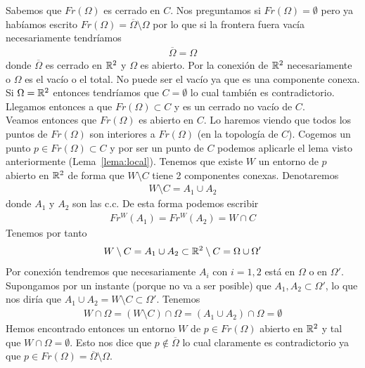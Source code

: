 \begin{observacion}
    Sabemos que $Fr(\Omega)$ es cerrado en $C$. Nos preguntamos si $Fr(\Omega)=\emptyset$ pero ya habíamos escrito $Fr(\Omega) = \overline{\Omega} \setminus \Omega$ por lo que si la frontera fuera vacía necesariamente tendríamos
    \begin{gather*}
        \overline{\Omega} = \Omega
    \end{gather*}
    donde $\overline{\Omega}$ es cerrado en $\mathbb{R}^2$ y $\Omega$ es abierto. Por la conexión de $\mathbb{R}^2$ necesariamente o $\Omega$ es el vacío o el total. No puede ser el vacío ya que es una componente conexa. Si $\Omega=\mathbb{R}^2$ entonces tendríamos que $C=\emptyset$ lo cual también es contradictorio. Llegamos entonces a que $Fr(\Omega)\subset C$ y es un cerrado no vacío de $C$.\\

    Veamos entonces que $Fr(\Omega)$ es abierto en $C$. Lo haremos viendo que todos los puntos de $Fr(\Omega)$ son interiores a $Fr(\Omega)$ (en la topología de $C$). Cogemos un punto $p\in Fr(\Omega)\subset C$ y por ser un punto de $C$ podemos aplicarle el lema visto anteriormente (Lema~\ref{lema:local}). Tenemos que existe $W$ un entorno de $p$ abierto en $\mathbb{R}^2$ de forma que $W\setminus C$ tiene 2 componentes conexas. Denotaremos 
    \begin{gather*}
        W \setminus C = A_1 \cup A_2
    \end{gather*}
    donde $A_1$ y $A_2$ son las c.c. De esta forma podemos escribir
    \begin{gather*}
        Fr^W(A_1) = Fr^W(A_2) = W \cap C
    \end{gather*}
    Tenemos por tanto
    \begin{gather*}
        W \setminus C = A_1 \cup A_2 \subset \mathbb{R}^2 \setminus C = \Omega \cup \Omega'
    \end{gather*}
    Por conexión tendremos que necesariamente $A_i$ con $i=1,2$ está en $\Omega$ o en $\Omega'$. Supongamos por un instante (porque no va a ser posible) que $A_1, A_2\subset \Omega'$, lo que nos diría que $A_1\cup A_2 = W \setminus C \subset  \Omega'$. Tenemos
    \begin{gather*}
        W \cap \Omega = (W \setminus C) \cap \Omega = (A_1\cup A_2) \cap \Omega = \emptyset
    \end{gather*}
    Hemos encontrado entonces un entorno $W$ de $p\in Fr(\Omega)$ abierto en $\mathbb{R}^2$ y tal que $W\cap \Omega = \emptyset$. Esto nos dice que $p\not\in \overline{\Omega}$ lo cual claramente es contradictorio ya que $p\in Fr(\Omega) = \overline{\Omega} \setminus \Omega$.\\


\end{observacion}

